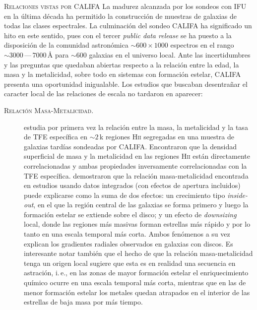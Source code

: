 \documentclass[xcolor=dvipsnames,4pt,hyperref={colorlinks,citecolor=black,linkcolor=black,urlcolor=black}]{beamer}
\begin{document}
\begin{frame}[allowframebreaks]{\textsc{Relaciones vistas por CALIFA}}
%
La madurez alcanzada por los sondeos con IFU en la última década ha permitido la construcción de
muestras de galaxias de todas las clases espectrales. La culminación del sondeo CALIFA
\citep{Sanchez2012, Sanchez2016} ha significado un hito en este sentido, pues con el tercer
\emph{public data release} se ha puesto a la disposición de la comunidad astronómica
$\sim600\times1000$ espectros en el rango $\sim3000\,$---$\,7000\,$\AA{} para $\sim600$ galaxias en
el universo local.
Ante las incertidumbres y las preguntas que quedaban abiertas respecto a la relación entre la edad,
la masa y la metalicidad, sobre todo en sistemas con formación estelar, CALIFA presenta una
oportunidad inigualable. Los estudios que buscaban desentrañar el caracter local de las relaciones
de escala no tardaron en aparecer:
%
\begin{description}
%
\item[\textsc{Relación Masa-Metalicidad.}] \citet{Rosales2012} estudia por primera vez la relación
entre la masa, la metalicidad y la tasa de TFE específica en $\sim2\,$k regiones H\textsc{ii}
segregadas en una muestra de galaxias tardías sondeadas por CALIFA.
Encontraron que la densidad superficial de masa y la metalicidad en las regiones H\textsc{ii} están
directamente correlacionadas y ambas propiedades inversamente correlacionadas con la TFE específica.
\citeauthor{Rosales2012} demostraron que la relación masa-metalicidad encontrada en estudios usando
datos integrados (con efectos de apertura incluidos) puede explicarse como la suma de dos efectos:
un crecimiento tipo \emph{inside-out}, en el que la región central de las galaxias se forma primero
y luego la formación estelar se extiende sobre el disco; y un efecto de \emph{downsizing} local,
donde las regiones más masivas forman estrellas más rápido y por lo tanto en una escala temporal más
corta. Ambos fenómenos a su vez explican los gradientes radiales observados en galaxias con discos.
Es interesante notar también que el hecho de que la relación masa-metalicidad tenga un origen local
sugiere que esta es en realidad una secuencia en astración, i.\,e., en las zonas de mayor formación
estelar el enriquecimiento químico ocurre en una escala temporal más corta, mientras que en las de
menor formación estelar los metales quedan atrapados en el interior de las estrellas de baja masa
por más tiempo.


\end{description}
\end{frame}
\end{document}
